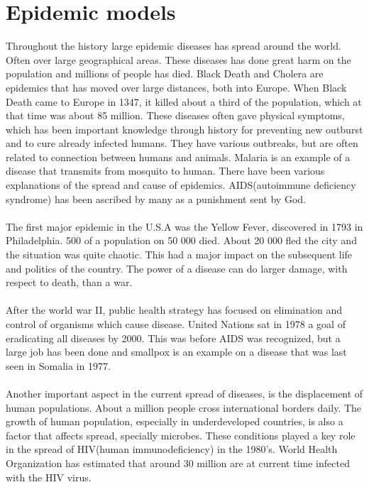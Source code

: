 \documentclass[%
twoside,                 %
final,                   %
10pt]{article}
\begin{document}
\section{Epidemic models}
Throughout the history large epidemic diseases has spread around the world. Often over large geographical areas. These diseases has done great harm on the population and millions of people has died. Black Death and Cholera are epidemics that has moved over large distances, both into Europe. When Black Death came to Europe in 1347, it killed about a third of the population, which at that time was about 85 million. These diseases often gave physical symptoms, which has been important knowledge through history for preventing new outburst and to cure already infected humans. They have various outbreaks, but are often related to connection between humans and animals. Malaria is an example of a disease that transmits from mosquito to human. There have been various explanations of the spread and cause of epidemics. AIDS(autoimmune deficiency syndrome) has been ascribed by many as a punishment sent by God.
\\
\\
The first major epidemic in the U.S.A was the Yellow Fever, discovered in 1793 in Philadelphia. 500 of a population on 50 000 died. About 20 000 fled the city and the situation was quite chaotic. This had a major impact on the subsequent life and politics of the country. The power of a disease can do larger damage, with respect to death, than a war.
\\
\\
After the world war II, public health strategy has focused on elimination and control of organisms which cause disease. United Nations sat in 1978 a goal of eradicating all diseases by 2000. This was before AIDS was recognized, but a large job has been done and smallpox is an example on a disease that was last seen in Somalia in 1977.
\\
\\
Another important aspect in the current spread of diseases, is the displacement of human populations. About a million people cross international borders daily. The growth of human population, especially in underdeveloped countries, is also a factor that affects spread, specially microbes. These conditions played a key role in the spread of HIV(human immunodeficiency) in the 1980's. World Health Organization has estimated that around 30 million are at current time infected with the HIV virus.
\\
\\
\end{document}
